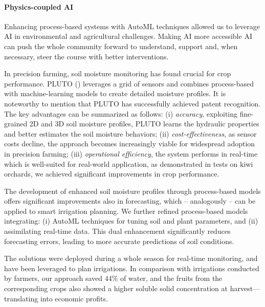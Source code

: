 \paragraph{Physics-coupled AI}
Enhancing process-based systems with AutoML techniques allowed us to leverage AI in environmental and agricultural challenges.
Making AI more accessible AI can push the whole community forward to understand, support and, when necessary, steer the course with better interventions.

In precision farming, soil moisture monitoring has found crucial for crop performance.
PLUTO () leverages a grid of sensors and combines process-based with machine-learning models to create detailed moisture profiles.
It is noteworthy to mention that PLUTO has successfully achieved patent recognition.
The key advantages can be summarized as follows: (i) \textit{accuracy}, exploiting fine-grained 2D and 3D soil moisture profiles, PLUTO learns the hydraulic properties and better estimates the soil moisture behaviors;
(ii) \textit{cost-effectiveness}, as sensor costs decline, the approach becomes increasingly viable for widespread adoption in precision farming;
(iii) \textit{operational efficiency}, the system performs in real-time which is well-suited for real-world application, as demonstrated in tests on kiwi orchards, we achieved significant improvements in crop performance.

The development of enhanced soil moisture profiles through process-based models offers significant improvements also in forecasting, which -- analogously -- can be applied to smart irrigation planning.
We further refined process-based models integrating: (i) AutoML techniques for tuning soil and plant parameters, and (ii) assimilating real-time data. This dual enhancement significantly reduces forecasting errors, leading to more accurate predictions of soil conditions.

The solutions were deployed during a whole season for real-time monitoring, and have been leveraged to plan irrigations.
In comparison with irrigations conducted by farmers, our approach saved 44\% of water, and the fruits from the corresponding crops also showed a higher soluble solid concentration at harvest---translating into economic profits.

